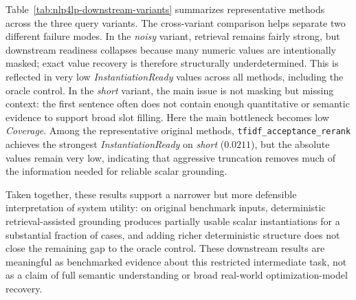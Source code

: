 \documentclass[pdflatex,sn-basic,Numbered]{sn-jnl}
\begin{document}
Table~\ref{tab:nlp4lp-downstream-variants} summarizes representative methods across the three query variants. The cross-variant comparison helps separate two different failure modes. In the \emph{noisy} variant, retrieval remains fairly strong, but downstream readiness collapses because many numeric values are intentionally masked; exact value recovery is therefore structurally underdetermined. This is reflected in very low \textit{InstantiationReady} values across all methods, including the oracle control. In the \emph{short} variant, the main issue is not masking but missing context: the first sentence often does not contain enough quantitative or semantic evidence to support broad slot filling. Here the main bottleneck becomes low \textit{Coverage}. Among the representative original methods, \texttt{tfidf\_acceptance\_rerank} achieves the strongest \textit{InstantiationReady} on \emph{short} ($0.0211$), but the absolute values remain very low, indicating that aggressive truncation removes much of the information needed for reliable scalar grounding.

Taken together, these results support a narrower but more defensible interpretation of system utility: on original benchmark inputs, deterministic retrieval-assisted grounding produces partially usable scalar instantiations for a substantial fraction of cases, and adding richer deterministic structure does not close the remaining gap to the oracle control. These downstream results are meaningful as benchmarked evidence about this restricted intermediate task, not as a claim of full semantic understanding or broad real-world optimization-model recovery.
\end{document}
